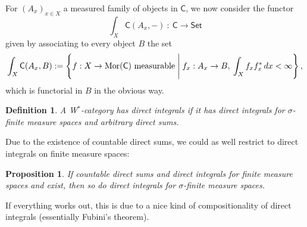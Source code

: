\documentclass[reqno,T1]{amsproc}
\newcommand{\cat}[1]{\mathsf{#1}}		%
\newcommand{\Set}{\mathsf{Set}}
\theoremstyle{plain}
\newtheorem{prop}[thm]{Proposition}
\newtheorem{defn}[thm]{Definition}
\theoremstyle{remark}
\numberwithin{equation}{section}
\begin{document}
For $(A_x)_{x\in X}$ a measured family of objects in $\cat{C}$, we now consider the functor
\[
	\int_X \cat{C}(A_x,-) \: : \: \cat{C}\to\Set
\]
given by associating to every object $B$ the set
\[
	\int_X \cat{C}(A_x , B) := \left\{ f : X\to\Mor{\cat{C}} \textrm{ measurable} \Biggm\vert f_x : A_x\to B,\: \int_X f_x f_x^* \,dx < \infty \right\},
\]
which is functorial in $B$ in the obvious way.


\begin{defn}
A W$^*$-category \emph{has direct integrals} if it has direct integrals for $\sigma$-finite measure spaces and arbitrary direct sums.
\end{defn}


Due to the existence of countable direct sums, we could as well restrict to direct integrals on finite measure spaces:

\begin{prop}
If countable direct sums and direct integrals for finite measure spaces and exist, then so do direct integrals for $\sigma$-finite measure spaces.
\end{prop}

If everything works out, this is due to a nice kind of compositionality of direct integrals (essentially Fubini's theorem).




\end{document}
